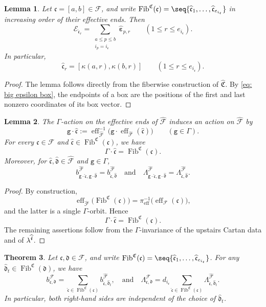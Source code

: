 \documentclass[12pt, leqno]{amsart}
\numberwithin{equation}{section}
\theoremstyle{plain}
\newtheorem{lemma}{Lemma}[section]
\newtheorem{theorem}[lemma]{Theorem}
\theoremstyle{definition}
\renewcommand{\le}{\leqslant}
\newcommand{\seteq}{\mathbin{:=}}
\newcommand{\ve}{\boldsymbol{\varepsilon}}
\newcommand{\ii}{ \textbf{\textit{i}}}
\newcommand{\Fib}{\operatorname{Fib}}
\newcommand{\eff}{\operatorname{eff}}
\newcommand{\hii}{{\widehat{\ii}}}
\newcommand{\hve}{{\widehat{\ve}}}
\newcommand{\frakC}{\mathfrak{C}}
\newcommand{\frakc}{\mathfrak{c}}
\newcommand{\frakd}{\mathfrak{d}}
\newcommand{\hfrakC}{\widehat{\frakC}}
\newcommand{\hfrakc}{\widehat{\frakc}}
\newcommand{\hfrakd}{\widehat{\frakd}}
\newcommand{\calE}{\mathcal{E}}
\newcommand{\calF}{\mathcal{F}}
\newcommand{\hcalF}{{\widehat{\calF}}}
\newcommand{\ttg}{\mathtt{g}}
\newcommand{\qtq}[1][{and}]{\quad\text{{#1}}\quad}
\begin{document}
\begin{lemma}\label{lem: big epsilon box fiber}
Let $\frakc=[a,b]\in\calF$, and write
$\Fib^{\frakC}(\frakc) = \seq{\hfrakc_1,\ldots,\hfrakc_{e_{i_{\frakc}}}}$
in  increasing order of their effective ends{}. Then
\[
\calE_{\hfrakc_r}
=
\sum_{\substack{a\le p\le b\\ i_p=i_{\frakc}}}
\hve_{p,r}
\qquad
(1\le r\le e_{i_{\frakc}}).
\]
In particular,
\[
\hfrakc_r=[\kappa(a,r),\kappa(b,r)]
\qquad(1\le r\le e_{i_{\frakc}}).
\] 
\end{lemma}

\begin{proof}
The lemma follows directly from the fiberwise construction of
$\hfrakC$.
By \eqref{eq: big epsilon box}, the endpoints of a box are the
positions of the first and last nonzero coordinates of its box vector.
\end{proof}

\begin{lemma}\label{lem: G action box fibers}
The $\Gamma$-action on the effective ends of $\hcalF$ induces an action on
$\hcalF$ by
\[
\ttg \cdot \hfrakc  \seteq \eff_{\hcalF}^{-1} \bigl(\ttg \cdot \eff_{\hcalF}(\hfrakc) \bigr) \qquad (\ttg \in \Gamma).
\]
For every $\frakc\in\calF$ and $\hfrakc\in\Fib^{\frakC}(\frakc)$,
we have
\[
\Gamma \cdot \hfrakc=\Fib^{\frakC}(\frakc).
\]
Moreover, for $\hfrakc,\hfrakd\in\hcalF$ and $\ttg\in \Gamma$,
\[
b^{\hcalF}_{\ttg \cdot\hfrakc ,\ttg \cdot\hfrakd } = b^{\hcalF}_{\hfrakc,\hfrakd} \qtq
\Lambda^{\hcalF}_{\ttg \cdot\hfrakc,\ttg \cdot\hfrakd } = \Lambda^{\hcalF}_{\hfrakc,\hfrakd}.
\]
\end{lemma}

\begin{proof}
By construction,
\[
\eff_{\hcalF}\bigl(\Fib^{\frakC}(\frakc)\bigr) = \pi_{\eff}^{-1}\bigl(\eff_\calF(\frakc)\bigr),
\]
and the latter is a single $\Gamma$-orbit. Hence
\[
\Gamma\cdot \hfrakc=\Fib^{\frakC}(\frakc).
\]
The remaining assertions follow from the $\Gamma$-invariance of the
upstairs Cartan data and of $\lambda^\hii$.
\end{proof}

\begin{theorem}\label{thm: ibox pair folding}
Let $\frakc,\frakd\in\calF$,  and write
$\Fib^{\frakC}(\frakc) =\seq{\hfrakc_1,\ldots,\hfrakc_{e_{i_\frakc}}}$. For any $\hfrakd_t\in\Fib^{\frakC}(\frakd)$, we have
\[
b^\calF_{\frakc,\frakd} = \sum_{\hfrakc\in\Fib^{\frakC}(\frakc)}b^{\hcalF}_{\hfrakc,\hfrakd_t},
\qtq
\Lambda^\calF_{\frakc,\frakd} = d_{i_{\frakc}} \sum_{\hfrakc\in\Fib^{\frakC}(\frakc)} \Lambda^{\hcalF}_{\hfrakc,\hfrakd_t}.
\]
In particular, both right-hand sides are independent of the choice of $\hfrakd_t$.
\end{theorem}
\end{document}
